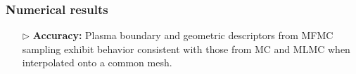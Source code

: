 \documentclass{beamer}
\begin{document}
\begin{frame}[t]
    \frametitle{Numerical results}
\begin{itemize}[leftmargin=5pt] 
\item[$\triangleright$] \textcolor{myblue3}{\bf Accuracy:} 
{\footnotesize Plasma boundary and geometric descriptors from MFMC sampling exhibit behavior consistent with those from MC and MLMC when interpolated onto a common mesh.}
\begin{figure}[ht!]\centering
{}
\end{figure}
\end{itemize}
\end{frame}
\end{document}
